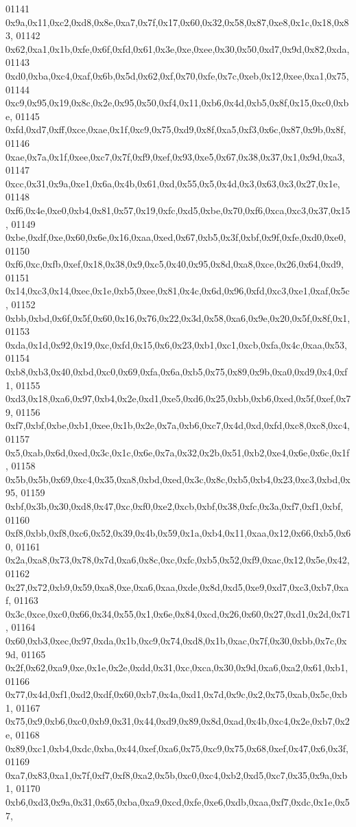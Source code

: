 \begin{DoxyCode}
01141   0x9a,0x11,0xc2,0xd8,0x8e,0xa7,0x7f,0x17,0x60,0x32,0x58,0x87,0xe8,0x1c,0x18,0x83,
01142   0x62,0xa1,0x1b,0xfe,0x6f,0xfd,0x61,0x3e,0xe,0xee,0x30,0x50,0xd7,0x9d,0x82,0xda,
01143   0xd0,0xba,0xc4,0xaf,0x6b,0x5d,0x62,0xf,0x70,0xfe,0x7c,0xeb,0x12,0xee,0xa1,0x75,
01144   0xc9,0x95,0x19,0x8c,0x2e,0x95,0x50,0xf4,0x11,0xb6,0x4d,0xb5,0x8f,0x15,0xc0,0xbe,
01145   0xfd,0xd7,0xff,0xce,0xae,0x1f,0xc9,0x75,0xd9,0x8f,0xa5,0xf3,0x6c,0x87,0x9b,0x8f,
01146   0xae,0x7a,0x1f,0xee,0xc7,0x7f,0xf9,0xef,0x93,0xe5,0x67,0x38,0x37,0x1,0x9d,0xa3,
01147   0xcc,0x31,0x9a,0xe1,0x6a,0x4b,0x61,0xd,0x55,0x5,0x4d,0x3,0x63,0x3,0x27,0x1e,
01148   0xf6,0x4e,0xe0,0xb4,0x81,0x57,0x19,0xfc,0xd5,0xbe,0x70,0xf6,0xca,0xc3,0x37,0x15,
01149   0xbe,0xdf,0xe,0x60,0x6e,0x16,0xaa,0xed,0x67,0xb5,0x3f,0xbf,0x9f,0xfe,0xd0,0xe0,
01150   0xf6,0xc,0xfb,0xef,0x18,0x38,0x9,0xc5,0x40,0x95,0x8d,0xa8,0xce,0x26,0x64,0xd9,
01151   0x14,0xc3,0x14,0xec,0x1e,0xb5,0xee,0x81,0x4c,0x6d,0x96,0xfd,0xc3,0xe1,0xaf,0x5c,
01152   0xbb,0xbd,0x6f,0x5f,0x60,0x16,0x76,0x22,0x3d,0x58,0xa6,0x9e,0x20,0x5f,0x8f,0x1,
01153   0xda,0x1d,0x92,0x19,0xc,0xfd,0x15,0x6,0x23,0xb1,0xc1,0xcb,0xfa,0x4c,0xaa,0x53,
01154   0xb8,0xb3,0x40,0xbd,0xc0,0x69,0xfa,0x6a,0xb5,0x75,0x89,0x9b,0xa0,0xd9,0x4,0xf1,
01155   0xd3,0x18,0xa6,0x97,0xb4,0x2e,0xd1,0xe5,0xd6,0x25,0xbb,0xb6,0xed,0x5f,0xef,0x79,
01156   0xf7,0xbf,0xbe,0xb1,0xee,0x1b,0x2e,0x7a,0xb6,0xc7,0x4d,0xd,0xfd,0xc8,0xc8,0xc4,
01157   0x5,0xab,0x6d,0xed,0x3c,0x1c,0x6e,0x7a,0x32,0x2b,0x51,0xb2,0xe4,0x6e,0x6c,0x1f,
01158   0x5b,0x5b,0x69,0xc4,0x35,0xa8,0xbd,0xed,0x3c,0x8c,0xb5,0xb4,0x23,0xc3,0xbd,0x95,
01159   0xbf,0x3b,0x30,0xd8,0x47,0xc,0xf0,0xe2,0xcb,0xbf,0x38,0xfc,0x3a,0xf7,0xf1,0xbf,
01160   0xf8,0xbb,0xf8,0xc6,0x52,0x39,0x4b,0x59,0x1a,0xb4,0x11,0xaa,0x12,0x66,0xb5,0x60,
01161   0x2a,0xa8,0x73,0x78,0x7d,0xa6,0x8c,0xc,0xfc,0xb5,0x52,0xf9,0xac,0x12,0x5e,0x42,
01162   0x27,0x72,0xb9,0x59,0xa8,0xe,0xa6,0xaa,0xde,0x8d,0xd5,0xe9,0xd7,0xc3,0xb7,0xaf,
01163   0x3c,0xce,0xc0,0x66,0x34,0x55,0x1,0x6e,0x84,0xcd,0x26,0x60,0x27,0xd1,0x2d,0x71,
01164   0x60,0xb3,0xec,0x97,0xda,0x1b,0xc9,0x74,0xd8,0x1b,0xac,0x7f,0x30,0xbb,0x7c,0x9d,
01165   0x2f,0x62,0xa9,0xe,0x1e,0x2e,0xdd,0x31,0xc,0xca,0x30,0x9d,0xa6,0xa2,0x61,0xb1,
01166   0x77,0x4d,0xf1,0xd2,0xdf,0x60,0xb7,0x4a,0xd1,0x7d,0x9c,0x2,0x75,0xab,0x5c,0xb1,
01167   0x75,0x9,0xb6,0xc0,0xb9,0x31,0x44,0xd9,0x89,0x8d,0xad,0x4b,0xc4,0x2e,0xb7,0x2e,
01168   0x89,0xc1,0xb4,0xdc,0xba,0x44,0xef,0xa6,0x75,0xc9,0x75,0x68,0xef,0x47,0x6,0x3f,
01169   0xa7,0x83,0xa1,0x7f,0xf7,0xf8,0xa2,0x5b,0xc0,0xc4,0xb2,0xd5,0xc7,0x35,0x9a,0xb1,
01170   0xb6,0xd3,0x9a,0x31,0x65,0xba,0xa9,0xcd,0xfe,0xe6,0xdb,0xaa,0xf7,0xdc,0x1e,0x57,

\end{DoxyCode}
